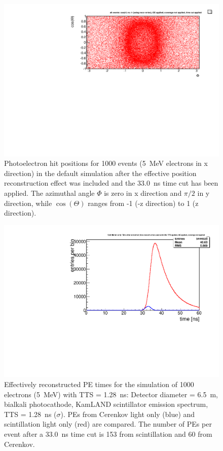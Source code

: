 \documentclass[aps,prc,twocolumn,groupedaddress,showpacs,amsmath,amssymb,floatfix,superscriptaddress]{revtex4}
\begin{document}
\begin{figure}
        \begin{center}
        \includegraphics[scale=0.40]{graphs/theta_phi.pdf}
        \caption[]{Photoelectron hit positions for 1000 events (5~MeV electrons in x direction) in the default simulation after the effective position reconstruction effect was included and the 33.0~ns time cut has been applied. The azimuthal angle $\Phi$ is zero in x direction and $\pi/2$ in y direction, while $\cos(\Theta)$ ranges from -1 (-z direction) to 1 (z direction). \label{hitpattern_default}}
        \end{center}
\end{figure}
\begin{figure}
        \begin{center}
        \includegraphics[scale=0.40]{graphs/6p5Meter_5MeVElectrons_Bialkali_KamlandScintSpec_1p28nsTTS_TIME.pdf}
        \caption[]{Effectively reconstructed PE times for the simulation of 1000 electrons (5~MeV) with TTS = 1.28~ns: Detector diameter = 6.5~m, bialkali photocathode, KamLAND scintillator emission spectrum, TTS = 1.28~ns ($\sigma$). PEs from Cerenkov light only (blue) and scintillation light only (red) are compared. The number of PEs per event after a 33.0~ns time cut is 153 from scintillation and 60 from Cerenkov. \label{6p5Meter_5MeVElectrons_Bialkali_KamlandScintSpec_1p28nsTTS_TIME}}
        \end{center}
\end{figure}
\end{document}
